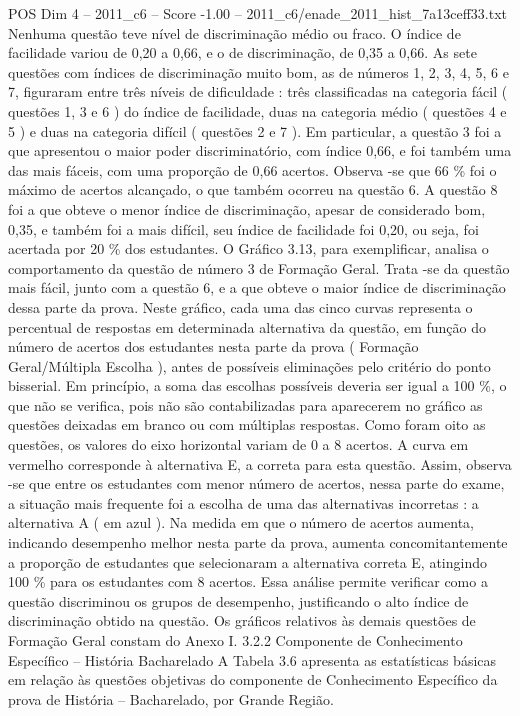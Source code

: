 \begin{textsample}{POS Dim 4 – 2011\_c6 – Score -1.00 – 2011\_c6/enade\_2011\_hist\_7a13ceff33.txt}
Nenhuma questão teve nível de discriminação médio ou fraco.
O índice de facilidade variou de 0,20 a 0,66, e o de discriminação, de 0,35 a 0,66.
As sete questões com índices de discriminação muito bom, as de números 1, 2, 3, 4, 5, 6 e 7, figuraram entre três níveis de dificuldade : três classificadas na categoria fácil ( questões 1, 3 e 6 ) do índice de facilidade, duas na categoria médio ( questões 4 e 5 ) e duas na categoria difícil ( questões 2 e 7 ).
Em particular, a questão 3 foi a que apresentou o maior poder discriminatório, com índice 0,66, e foi também uma das mais fáceis, com uma proporção de 0,66 acertos.
Observa -se que 66 \% foi o máximo de acertos alcançado, o que também ocorreu na questão 6.
A questão 8 foi a que obteve o menor índice de discriminação, apesar de considerado bom, 0,35, e também foi a mais difícil, seu índice de facilidade foi 0,20, ou seja, foi acertada por 20 \% dos estudantes.
O Gráfico 3.13, para exemplificar, analisa o comportamento da questão de número 3 de Formação Geral.
Trata -se da questão mais fácil, junto com a questão 6, e a que obteve o maior índice de discriminação dessa parte da prova.
Neste gráfico, cada uma das cinco curvas representa o percentual de respostas em determinada alternativa da questão, em função do número de acertos dos estudantes nesta parte da prova ( Formação Geral/Múltipla Escolha ), antes de possíveis eliminações pelo critério do ponto bisserial.
Em princípio, a soma das escolhas possíveis deveria ser igual a 100 \%, o que não se verifica, pois não são contabilizadas para aparecerem no gráfico as questões deixadas em branco ou com múltiplas respostas.
Como foram oito as questões, os valores do eixo horizontal variam de 0 a 8 acertos.
A curva em vermelho corresponde à alternativa E, a correta para esta questão.
Assim, observa -se que entre os estudantes com menor número de acertos, nessa parte do exame, a situação mais frequente foi a escolha de uma das alternativas incorretas : a alternativa A ( em azul ).
Na medida em que o número de acertos aumenta, indicando desempenho melhor nesta parte da prova, aumenta concomitantemente a proporção de estudantes que selecionaram a alternativa correta E, atingindo 100 \% para os estudantes com 8 acertos.
Essa análise permite verificar como a questão discriminou os grupos de desempenho, justificando o alto índice de discriminação obtido na questão.
Os gráficos relativos às demais questões de Formação Geral constam do Anexo I. 3.2.2 Componente de Conhecimento Específico – História Bacharelado A Tabela 3.6 apresenta as estatísticas básicas em relação às questões objetivas do componente de Conhecimento Específico da prova de História – Bacharelado, por Grande Região.

\end{textsample}
